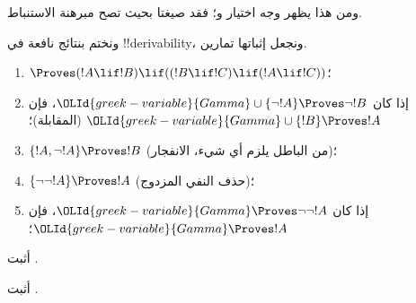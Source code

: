 \documentclass[../../../include/open-logic-section]{subfiles}
\begin{document}
ومن هذا يظهر وجه اختيار 
و؛ فقد صيغتا بحيث تصح مبرهنة الاستنباط.

ونختم بنتائج نافعة في !!{derivability}، ونجعل إثباتها تمارين.

\begin{prop}
\begin{enumerate}
\item $\Proves (!A \lif !B) \lif ((!B \lif !C)
  \lif (!A \lif !C))$؛ 
\item إذا كان ${\OLId{greek-variable}{Gamma}} \cup \{ \lnot !A\}
  \Proves \lnot !B$، فإن ${\OLId{greek-variable}{Gamma}} \cup \{ !B\} \Proves
  !A$ (المقابلة)؛ 
\item  $\{ !A, \lnot!A\} \Proves
    !B$ (من الباطل يلزم أي شيء، الانفجار)؛ 
\item  $\{ \lnot\lnot!A\} \Proves
  !A$ (حذف النفي المزدوج)؛
\item إذا كان ${\OLId{greek-variable}{Gamma}} \Proves \lnot\lnot!A$، فإن ${\OLId{greek-variable}{Gamma}} \Proves
  !A$؛
\end{enumerate}
\end{prop}

\begin{prob}
  أثبت .
\end{prob}
\tagendprob

\begin{prob}
  أثبت .
\end{prob}
\tagendprob
\end{document}

